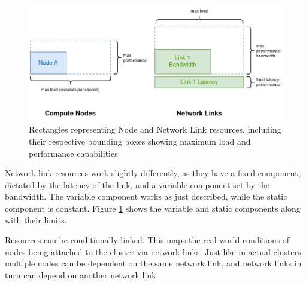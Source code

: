 \begin{figure}
    \centering
    \includegraphics[width=14cm]{graphics/diagrams/lb_squares_real.png}
    \caption{Rectangles representing Node and Network Link resources, including their respective bounding boxes showing maximum load and performance capabilities}
    \label{fig:lb_squares_real}
\end{figure}
Network link resources work slightly differently, as they have a fixed component, dictated by the latency of the link, and a variable component set by the bandwidth. The variable component works as just described, while the static component is constant. Figure \ref{fig:lb_squares_real} shows the variable and static components along with their limits.

Resources can be conditionally linked. This maps the real world conditions of nodes being attached to the cluster via network links. Just like in actual clusters multiple nodes can be dependent on the same network link, and network links in turn can depend on another network link. 

